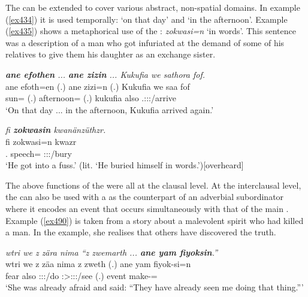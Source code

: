 The   can be extended to cover various abstract, non-spatial domains. In example (\ref{ex434}) it is used temporally: `on that day' and `in the afternoon'. Example (\ref{ex435}) shows a metaphorical use of the  : \emph{zokwasi=n} `in words'. This sentence was a description of a man who got infuriated at the demand of some of his relatives to give them his daughter as an exchange sister.

\begin{exe}
	\ex \emph{\textbf{ane efothen} ... \textbf{ane zizin} ... Kukufia we sathora fof.}\\
	\gll ane efoth=en (.) ane zizi=n (.) Kukufia we saa fof\\
	{\Dem} sun={\Loc} (.) {\Dem} afternoon={\Loc} (.) kukufia also \Tsg.\Masc:\Sbj:\Pst:\Pfv/arrive \Emph\\
	\trans `On that day ... in the afternoon, Kukufia arrived again.'
	\label{ex434}
\end{exe}
\begin{exe}
	\ex \emph{fi \textbf{zokwasin} kwanänzüthzr.}\\
	\gll fi zokwasi=n kwazr\\
	\Third.{\Abs} speech={\Loc} \Stsg:\Sbj:\Rpst:\Ipfv/bury\\
	\trans `He got into a fuss.' (lit. `He buried himself in words.'){\hspace*{1pt}\hfill{\footnotesize{[overheard]}}}
	\label{ex435}
\end{exe}

The above functions of the  were all at the clausal level. At the interclausal level, the  can also be used with a  as the counterpart of an adverbial subordinator where it encodes an event that occurs simultaneously with that of the main . Example (\ref{ex490}) is taken from a story about a malevolent spirit who had killed a man. In the example, she realises that others have discovered the truth.

\begin{exe}
	\ex \emph{wtri we z zära nima ``z zwemarth ... \textbf{ane yam fiyoksin}.''}\\
	\gll wtri we z zäa nima z zweth (.) ane yam fiyok-si=n\\
	fear also {\Iam} \Stsg:\Sbj:\Pst:\Pfv/do {\Quot} {\Iam} \Stpl:\Sbj>\Fsg:\Obj:\Rpst:\Pfv/see (.) {\Dem} event make-\Nmlz={\Loc}\\
	\trans `She was already afraid and said: ``They have already seen me doing that thing.'''\\
	\label{ex490}
\end{exe}

